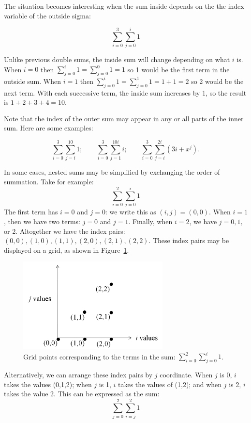 The situation becomes interesting when the sum inside depends on the the index variable of the outside sigma:

\[\sum_{i=0}^{3}\sum_{j=0}^{i}1\]

Unlike previous double sums, the inside sum will change depending on what $i$ is.  When $i=0$ then $\sum_{j=0}^{i}1=\sum_{j=0}^{0}1=1$ so 1 would be the first term in the outside sum.  When $i=1$ then $\sum_{j=0}^{i}1=\sum_{j=0}^{1}1=1+1=2$ so 2 would be the next term.  With each successive term, the inside sum increases by 1, so the result is $1+2+3+4 = 10$.

 Note that the index of the outer sum may appear in any or all parts of the inner sum. Here are some examples:  

\[\sum_{i=0}^{3} \sum_{j=i}^{10}1; \qquad
\sum_{i=0}^{3} \sum_{j=1}^{10i}i ; \qquad
\sum_{i=0}^{3}\sum_{j=i}^{2i}(3i+x^j).\]

In some cases, nested sums may be simplified by exchanging the order of summation.  Take for example:
\[\sum_{i=0}^{2}  \sum_{j=0}^{i}1 \]
The first term has $i=0$ and $j=0$: we write this as $(i,j)=(0,0)$. When $i=1$, then we have two terms:  $j=0$ and $j=1$. Finally, when $i=2$, we have $j=0,1,$ or 2.  Altogether we have the index pairs: $(0,0), (1,0), (1,1), (2,0), (2,1), (2,2)$. These index pairs may be displayed on a grid, as shown in Figure~\ref{fig:summation1}.
\begin{figure}[htb]
\begin{center}
	\includegraphics[width=3.0in]{images/i02j0igraph.png}
\caption{\label{fig:summation1} Grid points corresponding to the terms in the sum: $ \sum_{i=0}^{2}  \sum_{j=0}^{i}1 $.}
\end{center}
\end{figure} 

Alternatively, we can arrange these index pairs by $j$ coordinate.  When $j$ is 0, $i$ takes the values (0,1,2); when $j$ is 1, $i$ takes the values of (1,2); and when $j$ is 2, $i$ takes the value 2.  This can be expressed as the sum:
\[\sum_{j=0}^{2} \sum_{i=j}^{2}1 \]

